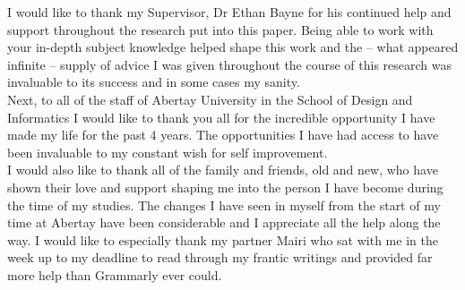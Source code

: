 \begin{acknowledgements}
I would like to thank my Supervisor, Dr Ethan Bayne for his continued help and support throughout the research put into this paper.
Being able to work with your in-depth subject knowledge helped shape this work and the -- what appeared infinite -- supply of advice I was given throughout the course of this research was invaluable to its success and in some cases my sanity.\\

Next, to all of the staff of Abertay University in the School of Design and Informatics I would like to thank you all for the incredible opportunity I have made my life for the past 4 years.
The opportunities I have had access to have been invaluable to my constant wish for self improvement.\\

I would also like to thank all of the family and friends, old and new, who have shown their love and support shaping me into the person I have become during the time of my studies.
The changes I have seen in myself from the start of my time at Abertay have been considerable and I appreciate all the help along the way.
I would like to especially thank my partner Mairi who sat with me in the week up to my deadline to read through my frantic writings and provided far more help than Grammarly ever could.
\end{acknowledgements}
